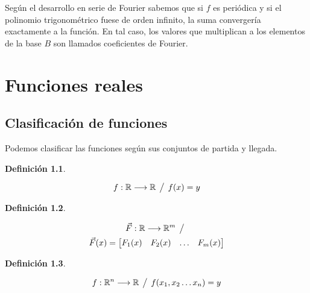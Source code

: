 \documentclass[a5paper,12pt,twoside]{book}
\newtheorem{defn}{{Definición}}[chapter]
\begin{document}
Según el desarrollo en serie de Fourier sabemos que si $f$ es periódica y si el polinomio trigonométrico fuese de orden infinito, la suma convergería exactamente a la función. En tal caso, los valores que multiplican a los elementos de la base $B$ son llamados coeficientes de Fourier.


\chapter{Funciones reales}


\section{Clasificación de funciones}

Podemos clasificar las funciones según sus conjuntos de partida y llegada.

\begin{mdframed}[style=MyFrame1]
    \begin{defn}
    \end{defn}
    \begin{equation*}
        f:\mathbb{R} \longrightarrow \mathbb{R} \hspace{1ex} \big/ \hspace{1ex} f(x)=y
    \end{equation*}
\end{mdframed}

\begin{mdframed}[style=MyFrame1]
    \begin{defn}
    \end{defn}
    \begin{multline*}
        \Vec{F}:\mathbb{R} \longrightarrow \mathbb{R}^m \hspace{1ex} \big/ \hspace{1ex}
        \\
        \Vec{F}(x) = \begin{bmatrix} F_1(x) & F_2(x) & \dots & F_m(x) \end{bmatrix}
    \end{multline*}
\end{mdframed}

\begin{mdframed}[style=MyFrame1]
    \begin{defn}
    \end{defn}
    \begin{equation*}
        f:\mathbb{R}^n \longrightarrow \mathbb{R} \hspace{1ex} \big/ \hspace{1ex} f(x_1,x_2 \dots x_n)=y
    \end{equation*}
\end{mdframed}
\end{document}
